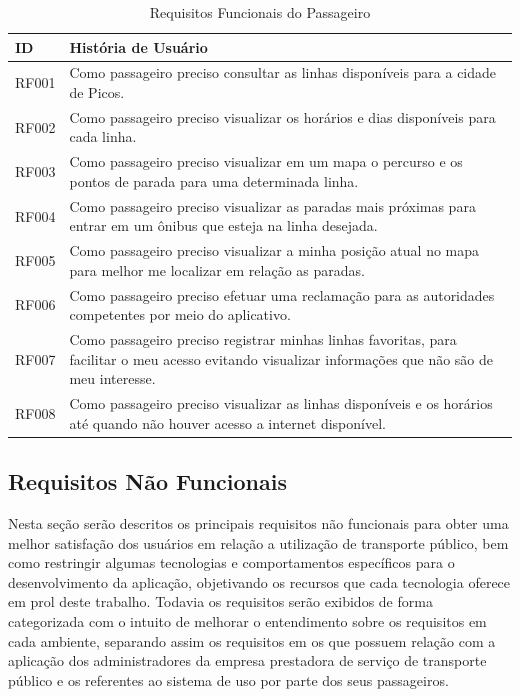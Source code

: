 {{\renewcommand{\arraystretch}{2}
\begin{table}[H]
\centering
\caption{Requisitos Funcionais do Passageiro}
\label{tab:passageiro-requisitos-funcionais}
\begin{tabular}{ l | p{13.5cm} }
\hline
\textbf{ID} & \textbf{História de Usuário} \\
\hline
RF001 & Como passageiro preciso consultar as linhas disponíveis para a cidade de Picos.\\ \hline
RF002 & Como passageiro preciso visualizar os horários e dias disponíveis para cada linha. \\ \hline
RF003 & Como passageiro preciso visualizar em um mapa o percurso e os pontos de parada para uma determinada linha. \\ \hline
RF004 & Como passageiro preciso visualizar as paradas mais próximas para entrar em um ônibus que esteja na linha desejada. \\ \hline
RF005 & Como passageiro preciso visualizar a minha posição atual no mapa para melhor me localizar em relação as paradas. \\ \hline
RF006 & Como passageiro preciso efetuar uma reclamação para as autoridades competentes por meio do aplicativo. \\ \hline
RF007 & Como passageiro preciso registrar minhas linhas favoritas, para facilitar o meu acesso evitando visualizar informações que não são de meu interesse. \\ \hline
RF008 & Como passageiro preciso visualizar as linhas disponíveis e os horários até quando não houver acesso a internet disponível. \\ \hline
\end{tabular}
\end{table}

\subsection{Requisitos Não Funcionais}

Nesta seção serão descritos os principais requisitos não funcionais para obter uma melhor satisfação dos usuários em relação a utilização de transporte público, bem como restringir algumas tecnologias e comportamentos específicos para o desenvolvimento da aplicação, objetivando os recursos que cada tecnologia oferece em prol deste trabalho. Todavia os requisitos serão exibidos de forma categorizada com o intuito de melhorar o entendimento sobre os requisitos em cada ambiente, separando assim os requisitos em os que possuem relação com a aplicação dos administradores da empresa prestadora de serviço de transporte público e os referentes ao sistema de uso por parte dos seus passageiros.

}}
